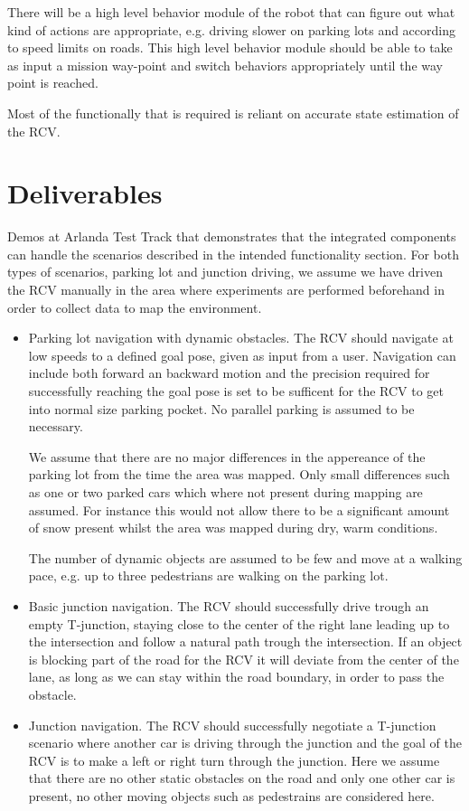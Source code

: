 \documentclass[11pt,a4paper]{article}
\begin{document}
There will be a high level behavior module of the robot that
can figure out what kind of actions are appropriate, e.g. driving
slower on parking lots and according to speed limits on roads. This
high level behavior module should be able to take as input a mission
way-point and switch behaviors appropriately until the way point is
reached.

Most of the functionally that is required is reliant on accurate
state estimation of the RCV.

\section{Deliverables}

Demos at Arlanda Test Track that demonstrates that the integrated
components can handle the scenarios described in the intended
functionality section. For both types of scenarios, parking lot and junction driving, we assume we have driven the RCV manually
in the area where experiments are performed beforehand in order to
collect data to map the environment.

\begin{itemize}


\item Parking lot navigation with dynamic obstacles. The RCV should navigate at low speeds 
  to a defined goal pose, given as input from a user. Navigation
can include both forward an backward motion and the precision
required for successfully reaching the goal pose is set to be
sufficent for the RCV to get into normal size parking pocket. No
parallel parking is assumed to be necessary.

We assume that there are no major differences in the appereance of the
parking lot from the time the area was mapped. Only small differences
such as one or two parked cars which where not present during mapping
are assumed. For instance this would not allow there to be a
significant amount of snow present whilst the area was mapped during
dry, warm conditions.

The number of dynamic objects are assumed to be few and move at a 
walking pace, e.g. up to three pedestrians are walking on the parking lot.

\item Basic junction navigation. The RCV should successfully drive
  trough an empty T-junction, staying close to the center of the right
  lane leading up to the intersection and follow a natural path trough the intersection.
  If an object is blocking part of the road for the RCV it will deviate from the center of the
  lane, as long as we can stay within the road boundary, in order to pass the obstacle.

\item Junction navigation. The RCV should successfully negotiate a
  T-junction scenario where another car is driving through the
  junction and the goal of the RCV is to make a left or right turn
  through the junction. Here we assume that there are no
  other static obstacles on the road and only one other car is present, no other moving
objects such as pedestrains are considered here.

\end{itemize}
\end{document}
